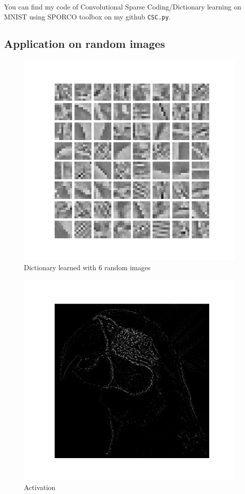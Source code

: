 \documentclass[a4paper,10pt]{article}
\begin{document}
You can find my code of Convolutional Sparse Coding/Dictionary learning on MNIST using SPORCO toolbox on my github \texttt{CSC.py}.\\

\newpage
\subsection{Application on random images}
\begin{figure}[h]
 \centering
 \includegraphics[scale=0.6]{Results/SPORCO_test_img/Figure_2.png}
 \caption{Dictionary learned with 6 random images}
\end{figure}
\begin{figure}[h]
 \centering
 \includegraphics[scale=0.455]{Results/SPORCO_test_img/activations.png}
 \caption{Activation}
\end{figure}
\end{document}
